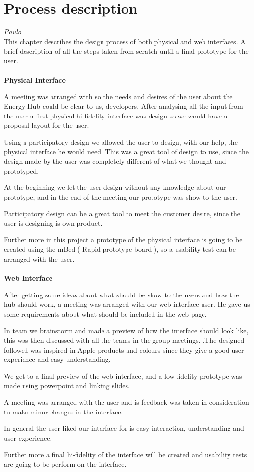 \chapter{Process description}

\textit{Paulo}\\
This chapter describes the design process of both physical and web interfaces. A brief description of all the steps taken from scratch until a final prototype for the user.
\\
\\\textbf{Physical Interface}

A meeting was arranged with so the needs and desires of the user about the Energy Hub could be clear to us, developers. After analysing all the input from the user a first physical hi-fidelity interface was design so we would have a proposal layout for the user. 

Using a participatory design we allowed the user to design, with our help, the physical interface he would need. This was a great tool of design to use, since the design made by the user was completely different of what we thought and prototyped. 

At the beginning we let the user design without any knowledge about our prototype, and in the end of the meeting our prototype was show to the user.

Participatory design can be a great tool to meet the customer desire, since the user is designing is own product.

Further more in this project a prototype of the physical interface is going to be created using the mBed ( Rapid prototype board ), so a usability test can be arranged with the user.
\\
\\\textbf{Web Interface} 

After getting some ideas about what should be show to the users and how the hub should work, a meeting was arranged with our web interface user. He gave us some requirements about what should be included in the web page. 

In team we brainstorm and made a preview of how the interface should look like, this was then discussed with all the teams in the group meetings. .The designed followed was inspired in Apple products and colours since they give a good user experience and easy understanding.

We get to a final preview of the web interface, and a low-fidelity prototype was made using powerpoint and linking slides. 

A meeting was arranged with the user and is feedback was taken in consideration to make minor changes in the interface.

In general the user liked our interface for is easy interaction, understanding and user experience.

Further more a final hi-fidelity of the interface will be created and usability tests are going to be perform on the interface.